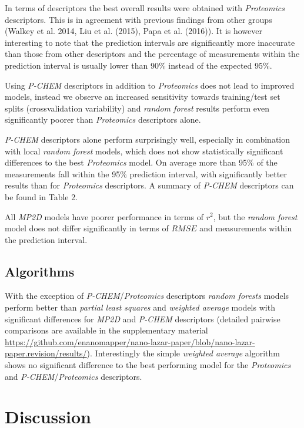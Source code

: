 \documentclass[utf8]{frontiersHLTH} %
\begin{document}
In terms of descriptors the best overall results were obtained with
\emph{Proteomics} descriptors. This is in agreement with previous
findings from other groups (Walkey et al. 2014, Liu et al. (2015), Papa
et al. (2016)). It is however interesting to note that the prediction
intervals are significantly more inaccurate than those from other
descriptors and the percentage of measurements within the prediction
interval is usually lower than 90\% instead of the expected 95\%.

Using \emph{P-CHEM} descriptors in addition to \emph{Proteomics} does
not lead to improved models, instead we observe an increased sensitivity
towards training/test set splits (crossvalidation variability) and
\emph{random forest} results perform even significantly poorer than
\emph{Proteomics} descriptors alone.

\emph{P-CHEM} descriptors alone perform surprisingly well, especially in
combination with local \emph{random forest} models, which does not show
statistically significant differences to the best \emph{Proteomics}
model. On average more than 95\% of the measurements fall within the
95\% prediction interval, with significantly better results than for
\emph{Proteomics} descriptors. A summary of \emph{P-CHEM} descriptors
can be found in Table 2.

All \emph{MP2D} models have poorer performance in terms of \(r^2\), but
the \emph{random forest} model does not differ significantly in terms of
\(RMSE\) and measurements within the prediction interval.

\subsection{Algorithms}\label{algorithms-1}

With the exception of \emph{P-CHEM}/\emph{Proteomics} descriptors
\emph{random forests} models perform better than \emph{partial least
squares} and \emph{weighted average} models with significant differences
for \emph{MP2D} and \emph{P-CHEM} descriptors (detailed pairwise
comparisons are available in the supplementary material
\url{https://github.com/enanomapper/nano-lazar-paper/blob/nano-lazar-paper.revision/results/}).
Interestingly the simple \emph{weighted average} algorithm shows no
significant difference to the best performing model for the
\emph{Proteomics} and \emph{P-CHEM}/\emph{Proteomics} descriptors.

\section{Discussion}\label{discussion}
\end{document}
